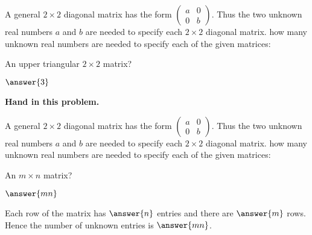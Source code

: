\documentclass{ximera}
\begin{document}



\problemlabel

\noindent A general $2\times 2$ diagonal matrix has the form $\left(\begin{array}{rr} a & 0 \\ 0 & b\end{array}\right)$.  Thus the two unknown real numbers $a$ and $b$ are needed to specify each $2\times 2$ diagonal matrix.  how many unknown real numbers are needed to specify each of the given matrices:

\begin{exercise}  \label{c1.3.1a}
An upper triangular $2\times 2$ matrix? \begin{prompt}$\answer{3}$\end{prompt}

{\center\bf Hand in this problem.}

%
\end{exercise}





\problemlabel

\noindent A general $2\times 2$ diagonal matrix has the form $\left(\begin{array}{rr} a & 0 \\ 0 & b\end{array}\right)$.  Thus the two unknown real numbers $a$ and $b$ are needed to specify each $2\times 2$ diagonal matrix.  how many unknown real numbers are needed to specify each of the given matrices:

\begin{exercise}  \label{c1.3.2}
An $m\times n$ matrix? \begin{prompt}$\answer{mn}$\end{prompt}

\begin{solution}
Each row of the matrix has $\answer{n}$ entries and there are $\answer{m}$ rows.  Hence the number of unknown entries is $\answer{mn}$.

\end{solution}
\end{exercise}
\end{document}
